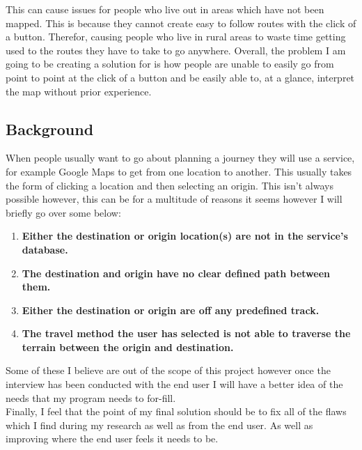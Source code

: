 \begin{flushleft}
        This can cause issues for people who live out in areas which have not been mapped. This is because they cannot create easy to follow routes with the click of a button. Therefor, 
        causing people who live in rural areas to waste time getting used to the routes they have to take to go anywhere. Overall, the problem I am going to be creating a solution for is 
        how people are unable to easily go from point to point at the click of a button and be easily able to, at a glance, interpret the map without prior experience. \\

        \subsection{Background}
        \bk
        When people usually want to go about planning a journey they will use a service, for example Google Maps to get from one location to another. This usually takes the form of clicking 
        a location and then selecting an origin. This isn't always possible however, this can be for a multitude of reasons it seems however I will briefly go over some below:\\
        
        \begin{enumerate}
            \item \textbf{Either the destination or origin location(s) are not in the service's database.}
            \item \textbf{The destination and origin have no clear defined path between them.}
            \item \textbf{Either the destination or origin are off any predefined track.}
            \item \textbf{The travel method the user has selected is not able to traverse the terrain between the origin and destination.}
        \end{enumerate}

        \bk
        Some of these I believe are out of the scope of this project however once the interview has been conducted with the end user I will have a better idea of the needs that my program needs to for-fill.\\

        \bk
        Finally, I feel that the point of my final solution should be to fix all of the flaws which I find during my research as well as from the end user. As well as improving where the end user feels it needs to be. \\


\end{flushleft}
